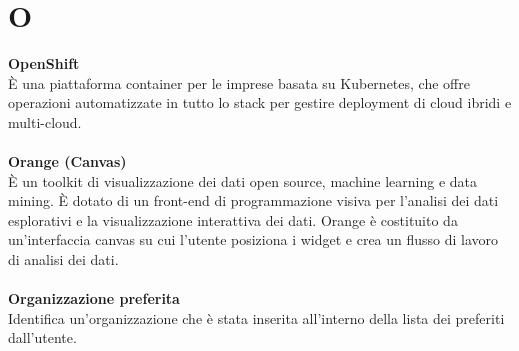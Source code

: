 \section{O}
\textbf{OpenShift}\\
È una piattaforma container per le imprese basata su Kubernetes, che offre operazioni automatizzate in tutto lo stack per gestire deployment di cloud ibridi e multi-cloud. \\ \\
\textbf{Orange (Canvas)}\\
È un toolkit di visualizzazione dei dati open source, machine learning e data mining. È dotato di un front-end di programmazione visiva per l'analisi dei dati esplorativi e la visualizzazione interattiva dei dati. Orange è costituito da un'interfaccia canvas su cui l'utente posiziona i widget e crea un flusso di lavoro di analisi dei dati. \\ \\
\textbf{Organizzazione preferita}\\
Identifica un'organizzazione che è stata inserita all'interno della lista dei preferiti dall'utente. \\ \\
\clearpage